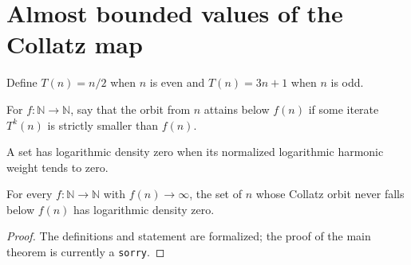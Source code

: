 \section{Almost bounded values of the Collatz map}

\begin{definition}
\label{def:collatz-map}
\leanok
Define $T(n)=n/2$ when $n$ is even and $T(n)=3n+1$ when $n$ is odd.
\end{definition}

\begin{definition}
\label{def:collatz-attains-below}
\leanok
{}
For $f:\mathbb N\to\mathbb N$, say that the orbit from $n$ attains below $f(n)$ if some iterate $T^k(n)$ is strictly smaller than $f(n)$.
\end{definition}

\begin{definition}
\label{def:collatz-log-density-zero}
\leanok
A set has logarithmic density zero when its normalized logarithmic harmonic weight tends to zero.
\end{definition}

\begin{theorem}
\label{thm:collatz-almost-bounded}
\notready
{}
For every $f:\mathbb N\to\mathbb N$ with $f(n)\to\infty$, the set of $n$ whose Collatz orbit never falls below $f(n)$ has logarithmic density zero.
\end{theorem}

\begin{proof}
The definitions and statement are formalized; the proof of the main theorem is currently a \texttt{sorry}.
\end{proof}
